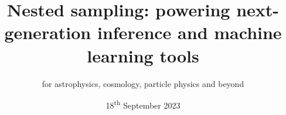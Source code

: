 \documentclass[aspectratio=169]{beamer}
\title{ Nested sampling: {\large powering next-generation inference and machine learning tools}}
\subtitle{for astrophysics, cosmology, particle physics and beyond}
\date{18\textsuperscript{th} September 2023}
\begin{document}
\begin{frame}
    \titlepage
\end{frame}

%
\end{document}
